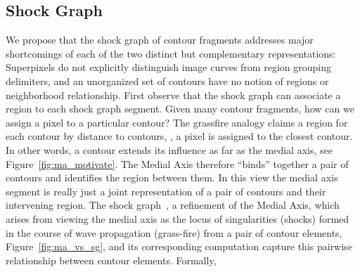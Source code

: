 \subsection{Shock Graph}
\label{sec:shock_graph}

We propose that the shock graph of contour fragments addresses major shortcomings of each of the two distinct but complementary representations: Superpixels do not explicitly distinguish image curves from region grouping delimiters, and an unorganized set of contours have no notion of regions or neighborhood relationship. First observe that the shock graph can associate a region to each shock graph segment. Given many contour fragments, how can we assign a pixel to a particular contour? The grassfire analogy claims a region for each contour by distance to contours, \ie, a pixel is assigned to the closest contour. In other words, a contour extends its influence as far as the medial axis, see Figure~\ref{fig:ma_motivate}. The Medial Axis therefore “binds” together a pair of contours and identifies the region between them.  In this view the medial axis segment is really just a joint representation of a pair of contours and their intervening region. The shock graph~\cite{Kimia:etal:ECCV:Book,Kimia:etal:Shape:Series:I,Giblin:Kimia:Reconstruction:PAMI03}, a refinement of the Medial Axis, which arises from viewing the medial axis as the locus of singularities (shocks) formed in the course of wave propagation (grass-fire) from a pair of contour elements, Figure~\ref{fig:ma_vs_sg}, and its corresponding computation capture this pairwise relationship between contour elements. Formally, 


